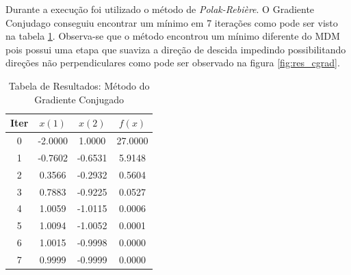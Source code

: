 \documentclass[a4paper,12pt,utf8x,notitlepage]{article}
\begin{document}
Durante a execução foi utilizado o método de \emph{Polak-Rebière}. O Gradiente Conjudago conseguiu encontrar um mínimo em 7 iterações como pode ser visto na tabela \ref{tab:res_cgrad}. Observa-se que o método encontrou um mínimo diferente do MDM pois possui uma etapa que suaviza a direção de descida impedindo possibilitando direções não perpendiculares como pode ser observado na figura \ref{fig:res_cgrad}.

\begin{table}[!htcb]
  \centering
  \begin{tabular}{|c|c|c|c|}
    \hline
    \rowcolor{kugray5}{}
    Iter  & $x(1)$ & $x(2)$ & $f(x)$\\ \hline
	0     & -2.0000	&  1.0000	&    27.0000\\ \hline
	1     & -0.7602	&  -0.6531  &  	5.9148\\ \hline
	2     & 0.3566	&  -0.2932  &  	0.5604\\ \hline
	3     & 0.7883	&  -0.9225  &  	0.0527\\ \hline
	4     & 1.0059	&  -1.0115  &  	0.0006\\ \hline
	5     & 1.0094	&  -1.0052  &  	0.0001\\ \hline
	6     & 1.0015	&  -0.9998  &  	0.0000\\ \hline
	\rowcolor{red!40}{}	
	7     & 0.9999	&  -0.9999  &  	0.0000\\ \hline
  \end{tabular}
  \caption{Tabela de Resultados: Método do Gradiente Conjugado}
  \label{tab:res_cgrad}
\end{table}
\end{document}
